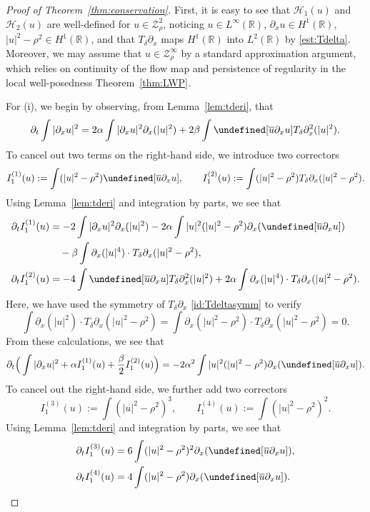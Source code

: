 \documentclass{amsart}
\numberwithin{equation}{section}
\newcommand{\R}{\mathbb{R}}
\newcommand{\Td}{T_{\delta}}
\let\Im=\undefined\DeclareMathOperator{\Im}{Im}
\begin{document}
\begin{proof}[Proof of Theorem~\ref{thm:conservation}]
First, it is easy to see that $\mathcal{H}_1(u)$ and $\mathcal{H}_2(u)$ are well-defined for $u\in \mathcal{Z}^2_\rho$, noticing $u\in L^\infty(\R)$, $\partial_xu\in H^1(\R)$, $|u|^2-\rho^2\in H^1(\R)$, and that $\Td\partial_x$ maps $H^1(\R)$ into $L^2(\R)$ by \eqref{est:Tdelta}.
Moreover, we may assume that $u\in \mathcal{Z}^\infty_\rho$ by a standard approximation argument, which relies on continuity of the flow map and persistence of regularity in the local well-posedness Theorem~\ref{thm:LWP}.

For (i), we begin by observing, from Lemma~\ref{lem:tderi}, that
\[ \partial_t \int |\partial_xu|^2 =2\alpha \int |\partial_xu|^2\partial_x(|u|^2) +2\beta \int \Im[\overline{u}\partial_xu] \Td \partial_x^2(|u|^2) .\]
To cancel out two terms on the right-hand side, we introduce two correctors 
\[ I_1^{(1)}(u):=\int (|u|^2-\rho^2)\Im[ \overline{u}\partial_{x}u],\qquad I_1^{(2)}(u):= \int (|u|^2-\rho^2)\Td \partial_{x}(|u|^2-\rho^2) .\]
Using Lemma~\ref{lem:tderi} and integration by parts, we see that
\begin{align*}
\partial_tI_1^{(1)}(u)&=-2\int |\partial_xu|^2\partial_x(|u|^2) -2\alpha \int |u|^2(|u|^2-\rho^2) \partial_x(\Im[\overline{u}\partial_xu]) \\
&\quad -\beta \int \partial_x(|u|^4)\cdot \Td \partial_x(|u|^2-\rho^2) ,\\
\partial_tI_1^{(2)}(u)&=-4\int \Im[\overline{u}\partial_xu] \Td\partial_x^2(|u|^2) +2\alpha \int\partial_x(|u|^4)\cdot \Td \partial_x(|u|^2-\rho^2) .
\end{align*}
Here, we have used the symmetry of $\Td\partial_x$ \eqref{id:Tdeltasymm} to verify
\[ \int \partial_x(|u|^2)\cdot \Td\partial_x(|u|^2-\rho^2)=\int \partial_x(|u|^2-\rho^2)\cdot \Td\partial_x(|u|^2-\rho^2)=0.\]
From these calculations, we see that
\[ \partial_t\Big( \int |\partial_xu|^2 +\alpha I_1^{(1)}(u)+\frac{\beta}{2}I_1^{(2)}(u)\Big) =-2\alpha ^2\int |u|^2(|u|^2-\rho^2)\partial_x(\Im[\overline{u}\partial_xu]).\]
To cancel out the right-hand side, we further add two correctors
\[ I_1^{(3)}(u):= \int (|u|^2-\rho^2)^3,\qquad I_1^{(4)}(u):=\int (|u|^2-\rho^2)^2 .\]
Using Lemma~\ref{lem:tderi} and integration by parts, we see that
\begin{align*}
\partial_tI_1^{(3)}(u)&=6\int (|u|^2-\rho^2)^2\partial_x (\Im[\overline{u}\partial_xu]),\\
\partial_tI_1^{(4)}(u)&=4\int (|u|^2-\rho^2)\partial_x (\Im[\overline{u}\partial_xu]) .

\end{align*}
\end{proof}
\end{document}
